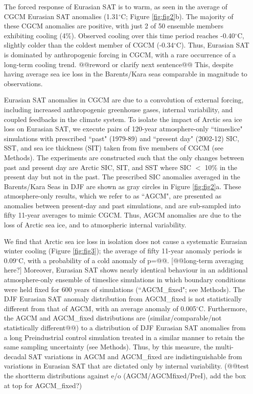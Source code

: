 \documentclass{nature}
\begin{document}
The forced response of Eurasian SAT is to warm, as seen in the average of CGCM Eurasian SAT anomalies (1.31$^\circ$C; Figure \ref{fig:fig2}b). The majority of these CGCM anomalies are positive, with just 2 of 50 ensemble members exhibiting cooling (4\%). Observed cooling over this time period reaches -0.40$^\circ$C, slightly colder than the coldest member of CGCM (-0.34$^\circ$C). Thus, Eurasian SAT is dominated by anthropogenic forcing in CGCM, with a rare occurrence of a long-term cooling trend. @@reword or clarify next sentence@@ This, despite having average sea ice loss in the Barents/Kara seas comparable in magnitude to observations. %

Eurasian SAT anomalies in CGCM are due to a convolution of external forcing, including increased anthropogenic greenhouse gases, internal variability, and coupled feedbacks in the climate system. To isolate the impact of Arctic sea ice loss on Eurasian SAT, we execute pairs of 120-year atmosphere-only ``timeslice" simulations with prescribed ``past" (1979-89) and ``present day" (2002-12) SIC, SST, and sea ice thickness (SIT) taken from five members of CGCM (see Methods). The experiments are constructed such that the only changes between past and present day are Arctic SIC, SIT, and SST where SIC $<$ 10\% in the present day but not in the past. The prescribed SIC anomalies averaged in the Barents/Kara Seas in DJF are shown as gray circles in Figure \ref{fig:fig2}a. These atmosphere-only results, which we refer to as ``AGCM", are presented as anomalies between present-day and past simulations, and are sub-sampled into fifty 11-year averages to mimic CGCM. Thus, AGCM anomalies are due to the loss of Arctic sea ice, and to atmospheric internal variability. 

We find that Arctic sea ice loss in isolation does not cause a systematic Eurasian winter cooling (Figure \ref{fig:fig3}); the average of fifty 11-year anomaly periods is 0.09$^\circ$C, with a probability of a cold anomaly of p=@@. [@@long-term averaging here?] Moreover, Eurasian SAT shows nearly identical behaviour in an additional atmosphere-only ensemble of timeslice simulations in which boundary conditions were held fixed for 600 years of simulations (``AGCM\_fixed"; see Methods). The DJF Eurasian SAT anomaly distribution from AGCM\_fixed is not statistically different from that of AGCM, with an average anomaly of 0.005$^\circ$C. Furthermore, the AGCM and AGCM\_fixed distributions are (similar/comparable/not statistically different@@) to a distribution of DJF Eurasian SAT anomalies from a long Preindustrial control simulation treated in a similar manner to retain the same sampling uncertainty (see Methods). Thus, by this measure, the multi-decadal SAT variations in AGCM and AGCM\_fixed are indistinguishable from variations in Eurasian SAT that are dictated only by internal variability. (@@test the shortterm distributions against e/o (AGCM/AGCMfixed/PreI), add the box at top for AGCM\_fixed?)
\end{document}
